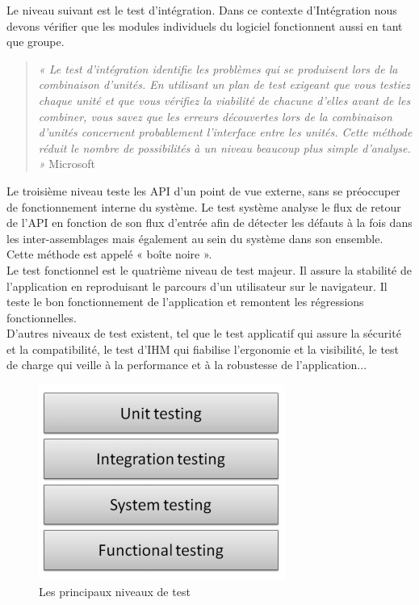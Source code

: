 \documentclass{report}
\begin{document}
        Le niveau suivant est le test d'intégration. Dans ce contexte d’Intégration nous devons vérifier que les modules individuels du logiciel fonctionnent aussi en tant que groupe.\\

        \begin{quotation}
          \emph{« Le test d'intégration identifie les problèmes qui se produisent lors de la combinaison d'unités. En utilisant un plan de test exigeant que vous testiez chaque unité et que vous vérifiez la viabilité de chacune d'elles avant de les combiner, vous savez que les erreurs découvertes lors de la combinaison d'unités concernent probablement l'interface entre les unités. Cette méthode réduit le nombre de possibilités à un niveau beaucoup plus simple d'analyse. »} Microsoft \cite{Mic16}\\
        \end{quotation}

        Le troisième niveau teste les API d’un point de vue externe, sans se préoccuper de fonctionnement interne du système. Le test système analyse le flux de retour de l’API en fonction de son flux d’entrée afin  de détecter les défauts à la fois dans les inter-assemblages mais également au sein du système dans son ensemble. Cette méthode est appelé « boîte noire ».\\

	       Le test fonctionnel est le quatrième niveau de test majeur. Il assure la stabilité de l’application en reproduisant le parcours d’un utilisateur sur le navigateur. Il teste le bon fonctionnement de l’application et remontent les régressions fonctionnelles.\\

         D’autres niveaux de test existent, tel que le test applicatif qui assure la sécurité et la compatibilité, le test d’IHM qui fiabilise l’ergonomie et la visibilité, le test de charge qui veille à la performance et à la robustesse de l’application...

         \begin{figure}
           \begin{center}
             \includegraphics[scale=0.7]{images/testingLevels.png}
           \end{center}
           \caption{Les principaux niveaux de test}
           \label{Testing levels}
         \end{figure}
\end{document}
